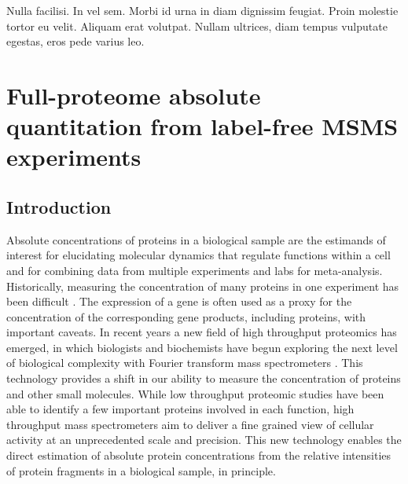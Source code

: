
\begin{savequote}[75mm] 
Nulla facilisi. In vel sem. Morbi id urna in diam dignissim feugiat. Proin molestie tortor eu velit. Aliquam erat volutpat. Nullam ultrices, diam tempus vulputate egestas, eros pede varius leo.
\end{savequote}

\chapter{Full-proteome absolute quantitation from label-free MSMS experiments}

\section{Introduction}
\label{proteomics:sec:intro}

Absolute concentrations of proteins in a biological sample are the estimands of interest for elucidating molecular dynamics that regulate functions within a cell \citep{Ishihama:2005ir} and for combining data from multiple experiments and labs for meta-analysis.
Historically, measuring the concentration of many proteins in one experiment has been difficult \citep{Ghaemmagham:2003tu}. 
The expression of a gene is often used as a proxy for the concentration of the corresponding gene products, including proteins, with important caveats.
In recent years a new field of high throughput proteomics has emerged, in which biologists and biochemists have begun exploring the next level of biological complexity with Fourier transform mass spectrometers  \citep{Scigelova:2006p10560,Scigelova:2011dt}.
This technology provides a shift in our ability to measure the concentration of proteins and other small molecules.
 While low throughput proteomic studies have been able to identify a few important proteins involved in  each function, high throughput mass spectrometers aim to deliver a fine grained view of cellular activity at an unprecedented scale and precision.
%
This new technology enables the direct estimation of absolute protein concentrations from the relative intensities of protein fragments in a biological sample, in principle.

